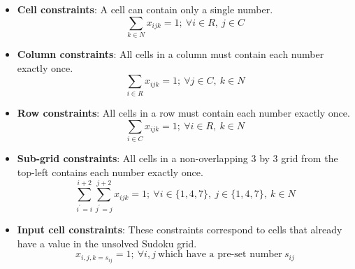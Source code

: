 \documentclass{article}
\begin{document}
\begin{itemize}
    \item \textbf{Cell constraints}: A cell can contain only a single number.
        \begin{equation*}
            \sum_{k \in N} x_{ijk} = 1 ; ~ \forall i \in R, ~ j \in C
        \end{equation*}
    \item \textbf{Column constraints}: All cells in a column must contain each number exactly once.
        \begin{equation*}
            \sum_{i \in R} x_{ijk} = 1 ; ~ \forall j \in C, ~ k \in N
        \end{equation*}
    \item \textbf{Row constraints}: All cells in a row must contain each number exactly once.
        \begin{equation*}
            \sum_{i \in C} x_{ijk} = 1 ; ~ \forall i \in R, ~ k \in N
        \end{equation*}
    \item \textbf{Sub-grid constraints}: All cells in a non-overlapping 3 by 3 grid from the top-left contains each number exactly once.
        \begin{equation*}
            \sum_{i^{\prime} = i}^{i + 2} \sum_{j^{\prime} = j}^{j + 2} x_{ijk} = 1 ; ~ \forall i \in \{1, 4, 7\}, ~ j \in \{1, 4, 7\}, ~ k \in N
        \end{equation*}
    \item \textbf{Input cell constraints}: These constraints correspond to cells that already have a value in the unsolved Sudoku grid.
        \begin{equation*}
            x_{i, j, k = s_{ij}} = 1; ~ \forall i, j ~ \text{which have a pre-set number} ~ s_{ij}
        \end{equation*}
\end{itemize}
\end{document}
